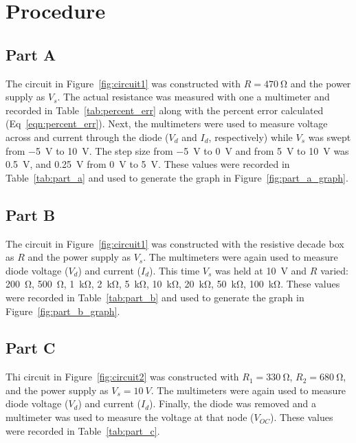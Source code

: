 \documentclass{article}
\begin{document}
\section{Procedure}
\label{sec:procedure}

\subsection{Part A}
\label{sec:proc_a}

The circuit in Figure~\ref{fig:circuit1} was constructed with $R =
\SI{470}{\ohm}$ and the power supply as $V_s$.  The actual resistance
was measured with one a multimeter and recorded in
Table~\ref{tab:percent_err} along with the percent error calculated
(Eq~\ref{eqn:percent_err}).  Next, the multimeters were used to
measure voltage across and current through the diode ($V_d$ and $I_d$,
respectively) while $V_s$ was swept from \SI{-5}{V} to \SI{+10}{V}.
The step size from \SI{-5}{V} to \SI{0}{V} and from \SI{5}{V} to
\SI{10}{V} was \SI{0.5}{V}, and \SI{0.25}{V} from \SI{0}{V} to
\SI{5}{V}.  These values were recorded in Table~\ref{tab:part_a} and
used to generate the graph in Figure~\ref{fig:part_a_graph}.

\subsection{Part B}
\label{sec:proc_b}

The circuit in Figure~\ref{fig:circuit1} was constructed with the
resistive decade box as $R$ and the power supply as $V_s$.  The
multimeters were again used to measure diode voltage ($V_d$) and
current ($I_d$).  This time $V_s$ was held at \SI{10}{V} and $R$
varied: \SI{200}{\ohm}, \SI{500}{\ohm}, \SI{1}{\kilo\ohm},
\SI{2}{\kilo\ohm}, \SI{5}{\kilo\ohm}, \SI{10}{\kilo\ohm},
\SI{20}{\kilo\ohm}, \SI{50}{\kilo\ohm}, \SI{100}{\kilo\ohm}.  These
values were recorded in Table~\ref{tab:part_b} and used to generate
the graph in Figure~\ref{fig:part_b_graph}.

\subsection{Part C}
\label{sec:proc_c}

Thi circuit in Figure~\ref{fig:circuit2} was constructed with $R_1 =
\SI{330}{\ohm}$, $R_2 = \SI{680}{\ohm}$, and the power supply as $V_s
= \SI{10}{V}$.  The multimeters were again used to measure diode
voltage ($V_d$) and current ($I_d$).  Finally, the diode was removed
and a multimeter was used to measure the voltage at that node
($V_{OC}$).  These values were recorded in Table~\ref{tab:part_c}.
\end{document}
